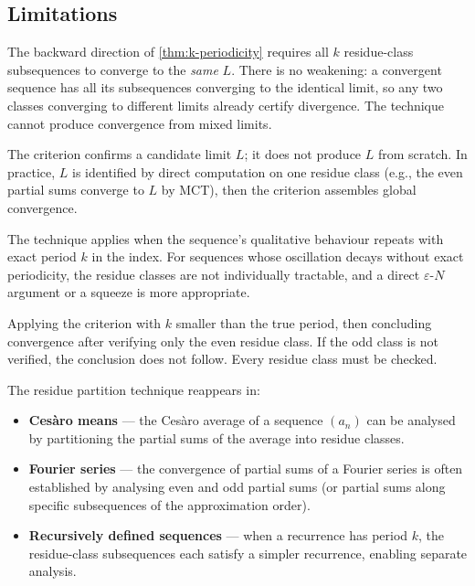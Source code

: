 \subsection*{Limitations}
\label{subsec:residue-limitations}

\begin{remark}
The backward direction of \cref{thm:k-periodicity} requires all $k$
residue-class subsequences to converge to the \emph{same} $L$. There is
no weakening: a convergent sequence has all its subsequences converging
to the identical limit, so any two classes converging to different limits
already certify divergence. The technique cannot produce convergence from
mixed limits.
\end{remark}

\begin{remark}
The criterion confirms a candidate limit $L$; it does not produce $L$ from
scratch. In practice, $L$ is identified by direct computation on one
residue class (e.g., the even partial sums converge to $L$ by MCT), then
the criterion assembles global convergence.
\end{remark}

\begin{remark}
The technique applies when the sequence's qualitative behaviour repeats
with exact period $k$ in the index. For sequences whose oscillation
decays without exact periodicity, the residue classes are not individually
tractable, and a direct $\varepsilon$-$N$ argument or a squeeze is more
appropriate.
\end{remark}

\begin{remark}
Applying the criterion with $k$ smaller than the true period, then
concluding convergence after verifying only the even residue class.
If the odd class is not verified, the conclusion does not follow.
Every residue class must be checked.
\end{remark}

\begin{remark}
The residue partition technique reappears in:
\begin{itemize}
  \item \textbf{Ces\`aro means} --- the Ces\`aro average of a sequence
        $(a_n)$ can be analysed by partitioning the partial sums of
        the average into residue classes.
  \item \textbf{Fourier series} --- the convergence of partial sums
        of a Fourier series is often established by analysing even and
        odd partial sums (or partial sums along specific subsequences of
        the approximation order).
  \item \textbf{Recursively defined sequences} --- when a recurrence
        has period $k$, the residue-class subsequences each satisfy a
        simpler recurrence, enabling separate analysis.
\end{itemize}
\end{remark}
